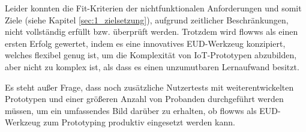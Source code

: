 Leider konnten die Fit-Kriterien der nichtfunktionalen Anforderungen und somit Ziele (siehe Kapitel \ref{sec:1_zielsetzung}), aufgrund zeitlicher Beschränkungen, nicht vollständig erfüllt bzw. überprüft werden. Trotzdem wird flowws als einen ersten Erfolg gewertet, indem es eine innovatives \ac{EUD}-Werkzeug konzipiert, welches flexibel genug ist, um die Komplexität von \ac{IoT}-Prototypen abzubilden, aber nicht zu komplex ist, als dass es einen unzumutbaren Lernaufwand besitzt.  

Es steht außer Frage, dass noch zusätzliche Nutzertests mit weiterentwickelten Prototypen und einer größeren Anzahl von Probanden durchgeführt werden müssen, um ein umfassendes Bild darüber zu erhalten, ob flowws als \ac{EUD}-Werkzeug zum Prototyping produktiv eingesetzt werden kann.